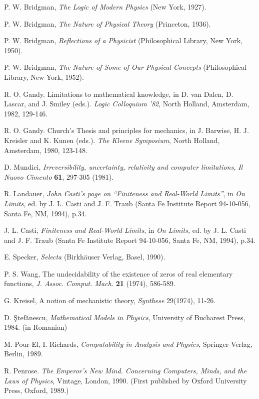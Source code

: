 \begin{thebibliography}{99}
P. W. Bridgman,
{\sl The Logic of Modern Physics}
(New York, 1927).

P. W. Bridgman,
{\sl The Nature of Physical Theory}
(Princeton, 1936).

P. W. Bridgman,
{\sl Reflections of a Physicist}
(Philosophical Library, New York, 1950).

P. W. Bridgman,
{\sl The Nature of Some of Our Physical Concepts}
(Philosophical Library, New York, 1952).


R. O. Gandy.  Limitations to mathematical knowledge,
in  D. van Dalen, D. Lascar, and
J. Smiley (eds.). {\it Logic Colloquium '82},  North Holland, Amsterdam,
1982, 129-146.

R. O. Gandy.  Church's Thesis and principles for mechanics,
in J. Barwise, H. J. Kreisler and
K. Kunen  (eds.). {\it  The Kleene Symposium}, North Holland, Amsterdam,
1980, 123-148.


D. Mundici, {\sl Irreversibility, uncertainty,
relativity and
computer limitations,} {\it Il Nuovo Cimento} {\bf 61}, 297-305 (1981).

R. Landauer,
{\sl John Casti's page on ``Finiteness and Real-World Limits''},
in {\sl On Limits,} ed. by J. L. Casti and J. F. Traub
(Santa Fe Institute Report 94-10-056, Santa Fe, NM, 1994), p.34.

J. L. Casti,
{\sl Finiteness and Real-World Limits},
in {\sl On Limits,} ed. by J. L. Casti and J. F. Traub
(Santa Fe Institute Report 94-10-056, Santa Fe, NM, 1994), p.34.

E. Specker, {\sl Selecta} (Birkh\"auser Verlag, Basel, 1990).

  P. S. Wang, The undecidability of the existence of
zeros of real elementary functions, {\it J. Assoc. Comput. Mach.}
{\bf 21}
(1974), 586-589.

G. Kreisel, A notion of mechanistic theory, {\it Synthese} 29(1974),
11-26.

  D. \c Stef\u anescu, {\it Mathematical Models in Physics},
 University of Bucharest Press, 1984. (in Romanian)

 M. Pour-El, I. Richards, {\em
Computability in Analysis and Physics},
 Springer-Verlag, Berlin,  1989.

 R. Penrose. {\em The Emperor's New Mind. Concerning Computers, Minds, and
 the Laws of Physics}, Vintage,  London, 1990. (First published by
Oxford University Press, Oxford, 1989.)


\end{thebibliography}
